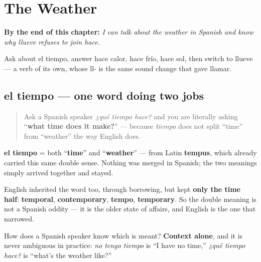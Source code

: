 
\chapter{The Weather}
\label{ch:spanish-weather}

\begin{chapteropening}
\textbf{By the end of this chapter:} \emph{I can talk about the weather in Spanish and know why llueve refuses to join hace.}

Ask about el tiempo, answer hace calor, hace frío, hace sol, then switch to llueve — a verb of its own, whose ll- is the same sound change that gave llamar.
\end{chapteropening}

\section[el tiempo]{el tiempo — one word doing two jobs}

\label{lesson:ES-C30-el-tiempo}



\begin{quote}
Ask a Spanish speaker \emph{¿qué tiempo hace?} and you are literally asking \textquotedblleft{}\textbf{what time does it make?}\textquotedblright{} — because \emph{tiempo} does not split \textquotedblleft{}time\textquotedblright{} from \textquotedblleft{}weather\textquotedblright{} the way English does.
\end{quote}

\begin{cousinweb}
\textbf{el tiempo} = both \textquotedblleft{}\textbf{time}\textquotedblright{} and \textquotedblleft{}\textbf{weather}\textquotedblright{} — from Latin \textbf{tempus}, which already carried this same double sense. Nothing was merged in Spanish; the two meanings simply arrived together and stayed.

English inherited the word too, through borrowing, but kept \textbf{only the time half}: \textbf{temporal}, \textbf{contemporary}, \textbf{tempo}, \textbf{temporary}. So the double meaning is not a Spanish oddity — it is the older state of affairs, and English is the one that narrowed.

How does a Spanish speaker know which is meant? \textbf{Context alone}, and it is never ambiguous in practice: \emph{no tengo tiempo} is \textquotedblleft{}I have no time,\textquotedblright{} \emph{¿qué tiempo hace?} is \textquotedblleft{}what's the weather like?\textquotedblright{}
\end{cousinweb}

